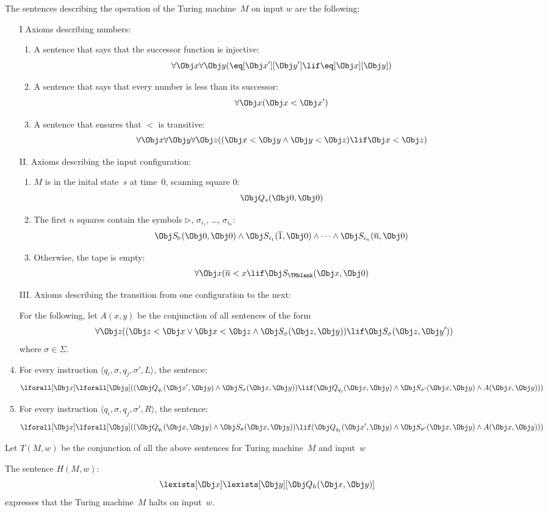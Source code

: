 \documentclass[../../../include/open-logic-section]{subfiles}
\begin{document}
The sentences describing the operation of the Turing machine~$M$ on
input $w$ are the following:
\begin{enumerate}
\item[I] Axioms describing numbers:
\begin{enumerate}
\item A sentence that says that the successor function is injective:
\[
\forall \Obj x \forall \Obj y(\eq[\Obj x'][\Obj y'] \lif \eq[\Obj x][\Obj y])
\]
\item A sentence that says that every number is less than its successor:
\[
\forall \Obj x(\Obj x < \Obj x')
\]
\item A sentence that ensures that $<$ is transitive:
\[
\forall \Obj x\forall \Obj y\forall \Obj z(
(\Obj x < \Obj y \land \Obj y < \Obj z) \lif \Obj x < \Obj z)
\]
\end{enumerate}
\item[II.] Axioms describing the input configuration:
\begin{enumerate}
\item $M$ is in the inital state~$s$ at time~0, scanning square 0:
\[
\Obj Q_s(\Obj 0, \Obj 0)
\]
\item The first $n$ squares contain the symbols $\triangleright$,
  $\sigma_{i_1}$, \dots, $\sigma_{i_n}$:
\[
\Obj S_\triangleright(\Obj 0, \Obj 0) \land
\Obj S_{i_1}(\overline 1, \Obj 0) \land
\dots \land
\Obj S_{i_n}(\overline n, \Obj 0)
\]
\item Otherwise, the tape is empty:
\[
\forall \Obj x(\overline{n} < x \lif \Obj
S_\text{\TMblank}(\Obj x, \Obj 0)
\]
\end{enumerate}
\item[III.] Axioms describing the transition from one configuration to
  the next:

For the following, let $A(x, y)$ be the conjunction of all sentences
of the form
\[
\forall \Obj z(
(\Obj z < \Obj x \lor \Obj x < \Obj z \land \Obj S_\sigma(\Obj z, \Obj y))
\lif \Obj S_\sigma(\Obj z, \Obj y'))
\]
where $\sigma \in \Sigma$.
\item For every instruction $\langle q_i, \sigma, q_j, \sigma',
  L\rangle$, the sentence:
\[
\lforall[\Obj x] \lforall[\Obj y](
   (\Obj Q_{q_i}(\Obj x', \Obj y) \land \Obj S_{\sigma}(\Obj x, \Obj y)) \lif
   (\Obj Q_{q_j}(\Obj x, \Obj y) \land \Obj S_{\sigma'}(\Obj x, \Obj y) \land
A(\Obj x, \Obj y)))
\]
\item For every instruction $\langle q_i, \sigma, q_j, \sigma',
  R\rangle$, the sentence:
\[
\lforall[\Obj x]\lforall[\Obj y](
   (\Obj Q_{q_i}(\Obj x, \Obj y) \land \Obj S_{\sigma}(\Obj x, \Obj y)) \lif
   (\Obj Q_{q_j}(\Obj x', \Obj y) \land \Obj S_{\sigma'}(\Obj x, \Obj y) \land
A(\Obj x, \Obj y)))
\]
\end{enumerate}


Let $T(M, w)$ be the conjunction of all the above sentences for Turing
machine~$M$ and input~$w$

The sentence $H(M, w)$:
\[
\lexists[\Obj x]\lexists[\Obj y][\Obj Q_h(\Obj x, \Obj y)]
\]
expresses that the Turing machine~$M$ halts on input~$w$.
\end{document}
